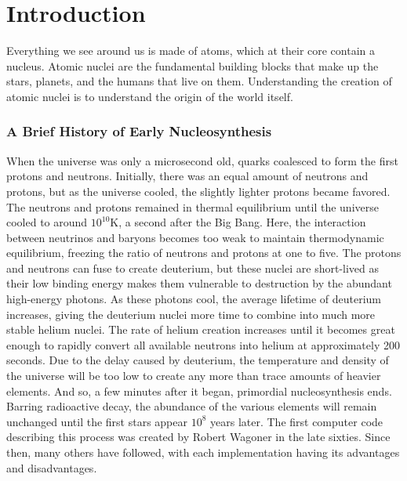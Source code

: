 
\chapter{Introduction}
\label{chap:intro}

Everything we see around us is made of atoms, which at their core contain a nucleus. Atomic nuclei are the fundamental building blocks that make up the stars, planets, and the humans that live on them. Understanding the creation of atomic nuclei is to understand the origin of the world itself. 


\subsection*{A Brief History of Early Nucleosynthesis}
When the universe was only a microsecond old, quarks coalesced to form the first protons and neutrons\cite{NASAUniversehistory}. Initially, there was an equal amount of neutrons and protons, but as the universe cooled, the slightly lighter protons became favored. The neutrons and protons remained in thermal equilibrium until the universe cooled to around $10^{10}$K, a second after the Big Bang. Here, the interaction between neutrinos and baryons becomes too weak to maintain thermodynamic equilibrium, freezing the ratio of neutrons and protons at one to five. The protons and neutrons can fuse to create deuterium, but these nuclei are short-lived as their low binding energy makes them vulnerable to destruction by the abundant high-energy photons. As these photons cool, the average lifetime of deuterium increases,
giving the deuterium nuclei more time to combine into much more stable helium nuclei. The rate of helium creation increases until it becomes great enough to rapidly convert all available neutrons into helium at approximately 200 seconds. Due to the delay caused by deuterium, the temperature and density of the universe will be too low to create any more than trace amounts of heavier elements. And so, a few minutes after it began, primordial nucleosynthesis ends. Barring radioactive decay, the abundance of the various elements will remain unchanged until the first stars appear $10^8$ years later\cite{klessen2023firststars}. 
The first computer code describing this process was created by Robert Wagoner in the late sixties\cite{Wagoner67}. Since then, many others have followed, with each implementation having its advantages and disadvantages.
\clearpage

